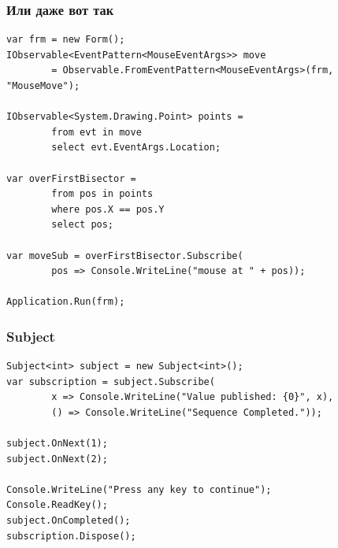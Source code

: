 \documentclass[xetex,mathserif,serif]{beamer}
\begin{document}
	\begin{frame}[fragile]
		\frametitle{Или даже вот так}
		\begin{small}
			\begin{verbatim}
var frm = new Form(); 
IObservable<EventPattern<MouseEventArgs>> move 
        = Observable.FromEventPattern<MouseEventArgs>(frm, "MouseMove");

IObservable<System.Drawing.Point> points = 
        from evt in move
        select evt.EventArgs.Location;

var overFirstBisector = 
        from pos in points
        where pos.X == pos.Y 
        select pos;

var moveSub = overFirstBisector.Subscribe(
        pos => Console.WriteLine("mouse at " + pos));

Application.Run(frm);
			\end{verbatim}
		\end{small}
	\end{frame}

	\begin{frame}[fragile]
		\frametitle{Subject}
		\begin{small}
			\begin{verbatim}
Subject<int> subject = new Subject<int>();
var subscription = subject.Subscribe(
        x => Console.WriteLine("Value published: {0}", x),
        () => Console.WriteLine("Sequence Completed."));

subject.OnNext(1);
subject.OnNext(2);

Console.WriteLine("Press any key to continue");
Console.ReadKey();
subject.OnCompleted();
subscription.Dispose();
			\end{verbatim}
		\end{small}
	\end{frame}
\end{document}
